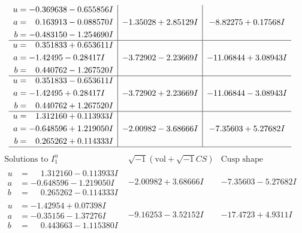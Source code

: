 \documentclass[1p]{elsarticle_modified}
\theoremstyle{definition}
\newcommand{\I}{\sqrt{-1}}
\begin{document}
$$\begin{array}{c|c|c}
\begin{aligned}
u &= -0.369638 - 0.655856 I \\
a &= \phantom{-}0.163913 - 0.088570 I \\
b &= -0.483150 - 1.254690 I\end{aligned}
 & -1.35028 + 2.85129 I & -8.82275 + 0.17568 I \\ \hline\begin{aligned}
u &= \phantom{-}0.351833 + 0.653611 I \\
a &= -1.42495 - 0.28417 I \\
b &= \phantom{-}0.440762 - 1.267520 I\end{aligned}
 & -3.72902 - 2.23669 I & -11.06844 + 3.08943 I \\ \hline\begin{aligned}
u &= \phantom{-}0.351833 - 0.653611 I \\
a &= -1.42495 + 0.28417 I \\
b &= \phantom{-}0.440762 + 1.267520 I\end{aligned}
 & -3.72902 + 2.23669 I & -11.06844 - 3.08943 I \\ \hline\begin{aligned}
u &= \phantom{-}1.312160 + 0.113933 I \\
a &= -0.648596 + 1.219050 I \\
b &= \phantom{-}0.265262 + 0.114333 I\end{aligned}
 & -2.00982 - 3.68666 I & -7.35603 + 5.27682 I\\
 \hline 
 \end{array}$$\newpage$$\begin{array}{c|c|c}  
\text{Solutions to }I^u_{1}& \I (\text{vol} + \sqrt{-1}CS) & \text{Cusp shape}\\
 \hline 
\begin{aligned}
u &= \phantom{-}1.312160 - 0.113933 I \\
a &= -0.648596 - 1.219050 I \\
b &= \phantom{-}0.265262 - 0.114333 I\end{aligned}
 & -2.00982 + 3.68666 I & -7.35603 - 5.27682 I \\ \hline\begin{aligned}
u &= -1.42954 + 0.07398 I \\
a &= -0.35156 - 1.37276 I \\
b &= \phantom{-}0.443663 - 1.115380 I\end{aligned}
 & -9.16253 - 3.52152 I & -17.4723 + 4.9311 I \\ \hline\begin{aligned}

\end{aligned}
\end{array}$$
\end{document}
